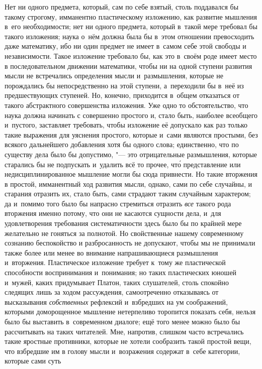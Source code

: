 Нет ни одного предмета, который, сам по себе взятый, столь поддавался бы такому
строгому, имманентно пластическому изложению, как развитие мышления в~его
необходимости; нет ни одного предмета, который в~такой мере требовал бы такого
изложения; наука о~нём должна была бы в~этом отношении превосходить даже
математику, ибо ни один предмет не имеет в~самом себе этой свободы и
независимости. Такое изложение требовало бы, как это в~своём роде имеет место в
последовательном движении математики, чтобы ни на одной ступени развития мысли
не встречались определения мысли и~размышления, которые не порождались бы
непосредственно на этой ступени, а~переходили бы в~неё из предшествующих
ступеней. Но, конечно, приходится в~общем отказаться от такого абстрактного
совершенства изложения. Уже одно то обстоятельство, что наука должна начинать с
совершенно простого и, стало быть, наиболее всеобщего и~пустого, заставляет
требовать, чтобы изложение её допускало как раз только такие выражения для
уяснения простого, которые и~сами являются простыми, без всякого дальнейшего
добавления хотя бы одного слова; единственно, что по существу дела было бы
допустимо, "--- это отрицательные размышления, которые старались бы не
подпускать и~удалить всё то прочее, чт\'{о} представление или
недисциплинированное мышление могли бы сюда привнести. Но такие вторжения в
простой, имманентный ход развития мысли, однако, сами по себе случайны, и
старания отразить их, стало быть, сами страдают таким случайным характером; да
и~помимо того было бы напрасно стремиться отразить {\em все} такого рода вторжения
именно потому, что они не касаются сущности дела, и~для удовлетворения
требования систематичности здесь было бы по крайней мере желательно не гоняться
за полнотой. Но свойственные нашему современному сознанию беспокойство и
разбросанность не допускают, чтобы мы не принимали также более или менее во
внимание напрашивающиеся размышления и~вторжения. Пластическое изложение
требует к~тому же пластической способности воспринимания и~понимания; но таких
пластических юношей и~мужей, каких придумывает Платон, таких слушателей, столь
спокойно следящих лишь за ходом рассуждения, самоотреченно отказываясь от
высказывания {\em собственных} рефлексий и~взбредших на ум соображений,
которыми доморощенное мышление нетерпеливо торопится показать себя, нельзя было
бы выставить в~современном диалоге; ещё того менее можно было бы рассчитывать
на таких читателей. Мне, напротив, слишком часто встречались такие яростные
противники, которые не хотели сообразить такой простой вещи, что взбредшие им в
голову мысли и~возражения содержат в~себе категории, которые сами суть
